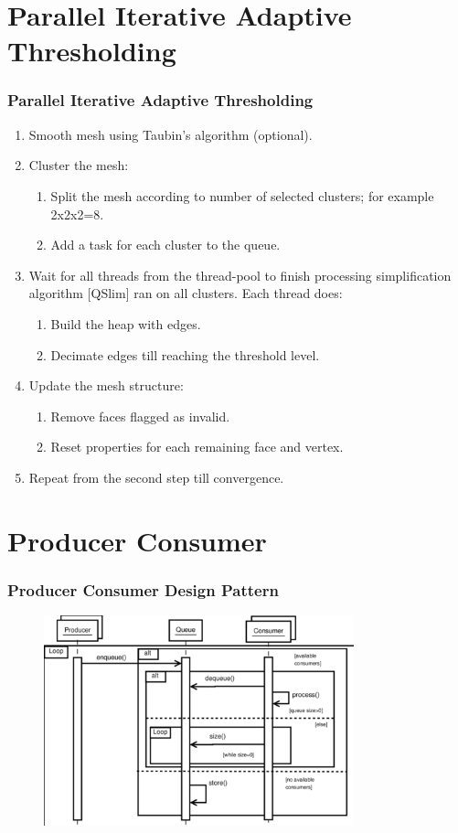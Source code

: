 \documentclass[
	10pt,
	t		%
]{beamer}
\begin{document}
\section{Parallel Iterative Adaptive Thresholding}
\begin{frame}
\frametitle{Parallel Iterative Adaptive Thresholding}
\centering
\begin{enumerate}
\color{gray}
\item Smooth mesh using Taubin's algorithm (optional).
\item Cluster the mesh:
\begin{enumerate}
\color{gray}
\item Split the mesh according to number of selected clusters; for example 2x2x2=8.
\item Add a task for each cluster to the queue.
\end{enumerate}
\color{black}
\item Wait for all threads from the thread-pool to finish processing simplification algorithm [QSlim] ran on all clusters. Each thread does:
\begin{enumerate}
\item Build the heap with edges.
\item Decimate edges till reaching the threshold level.
\end{enumerate}
\item Update the mesh structure:
\begin{enumerate}
\item Remove faces flagged as invalid.
\item Reset properties for each remaining face and vertex.
\end{enumerate}
\item Repeat from the second step till convergence.
\end{enumerate}
\end{frame}

\section{Producer Consumer}
\begin{frame}
\frametitle{Producer Consumer Design Pattern}
\begin{figure}[ht]
\centering
\includegraphics[width=0.8\textwidth]{producer_consumer}
\end{figure}
\end{frame}
\end{document}
